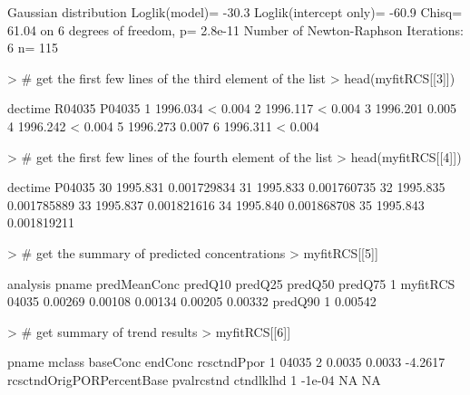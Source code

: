 \documentclass[11pt]{article}
\begin{document}
\begin{Schunk}
\begin{Soutput}
Gaussian distribution
Loglik(model)= -30.3   Loglik(intercept only)= -60.9
	Chisq= 61.04 on 6 degrees of freedom, p= 2.8e-11 
Number of Newton-Raphson Iterations: 6 
n= 115 
\end{Soutput}
\begin{Sinput}
> # get the first few lines of the third element of the list
> head(myfitRCS[[3]])
\end{Sinput}
\begin{Soutput}
   dectime R04035 P04035
1 1996.034      <  0.004
2 1996.117      <  0.004
3 1996.201         0.005
4 1996.242      <  0.004
5 1996.273         0.007
6 1996.311      <  0.004
\end{Soutput}
\begin{Sinput}
> # get the first few lines of the fourth element of the list
> head(myfitRCS[[4]])
\end{Sinput}
\begin{Soutput}
    dectime      P04035
30 1995.831 0.001729834
31 1995.833 0.001760735
32 1995.835 0.001785889
33 1995.837 0.001821616
34 1995.840 0.001868708
35 1995.843 0.001819211
\end{Soutput}
\begin{Sinput}
> # get the summary of predicted concentrations
> myfitRCS[[5]]
\end{Sinput}
\begin{Soutput}
  analysis pname predMeanConc predQ10 predQ25 predQ50 predQ75
1 myfitRCS 04035      0.00269 0.00108 0.00134 0.00205 0.00332
  predQ90
1 0.00542
\end{Soutput}
\begin{Sinput}
> # get summary of trend results
> myfitRCS[[6]]
\end{Sinput}
\begin{Soutput}
  pname mclass baseConc endConc rcsctndPpor
1 04035      2   0.0035  0.0033     -4.2617
  rcsctndOrigPORPercentBase pvalrcstnd ctndlklhd
1                    -1e-04         NA        NA
\end{Soutput}
\end{Schunk}
\end{document}
